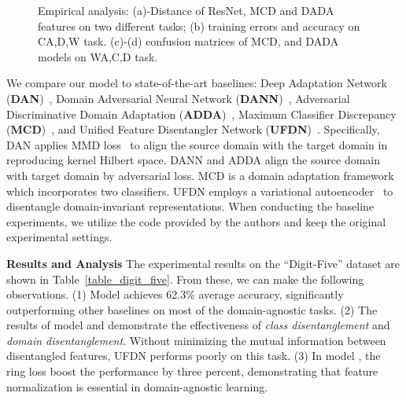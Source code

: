 \documentclass{article}
\begin{document}
 \vspace{0.2cm}
\begin{figure*}[t]
    \begin{minipage}{\hsize}
      \centering
     \centering
      \centering
      \centering
    \end{minipage}
    \vspace{-0.4cm}
  \caption{Empirical analysis: (a)-Distance of ResNet, MCD and DADA features on two different tasks; (b) training errors and accuracy on CA,D,W task. (c)-(d) confusion matrices of MCD, and DADA models on WA,C,D task. }
  \label{fig_office_confusion}
  
\end{figure*} 
We compare our model to state-of-the-art baselines: Deep Adaptation Network (\textbf{DAN})~\cite{long2015}, Domain Adversarial Neural Network (\textbf{DANN})~\cite{DANN}, Adversarial Discriminative Domain Adaptation (\textbf{ADDA})~\cite{adda}, Maximum Classifier Discrepancy (\textbf{MCD})~\cite{MCD_2018}, and Unified Feature Disentangler Network (\textbf{UFDN})~\cite{ufdn}. Specifically, DAN applies MMD loss~\cite{gretton2007kernel} to align the source domain with the target domain in reproducing kernel Hilbert space. DANN and ADDA align the source domain with target domain by adversarial loss. MCD is a domain adaptation framework which incorporates two  classifiers. UFDN employs a variational autoencoder~\cite{vae} to disentangle domain-invariant representations. When conducting the baseline experiments, we utilize the code provided by the authors and keep the original experimental settings. 

\textbf{Results and Analysis} The experimental results on the ``Digit-Five'' dataset are shown in Table~\ref{table_digit_five}. From these, we can make the following observations. (1) Model \textbf{} achieves 62.3\% average accuracy, significantly outperforming other baselines on most of the domain-agnostic tasks. (2) The results of model \textbf{} and \textbf{} demonstrate the effectiveness of \textit{class disentanglement} and \textit{domain disentanglement}. Without minimizing the mutual information between disentangled features, UFDN performs poorly on this task. (3) In model \textbf{}, the ring loss boost the performance by three percent, demonstrating that feature normalization is essential in domain-agnostic learning.
\end{document}
